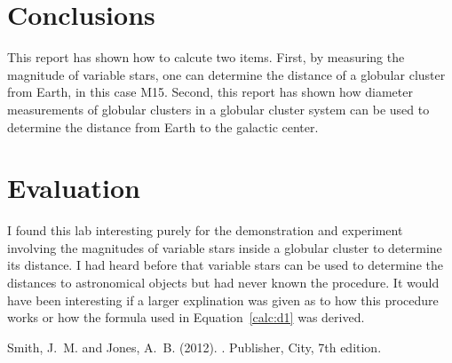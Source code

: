 \documentclass{article}
\begin{document}
\section{Conclusions}

This report has shown how to calcute two items. First, by measuring the magnitude of
variable stars, one can determine the distance of a globular cluster from Earth,
in this case M15. Second, this report has shown how diameter measurements of globular
clusters in a globular cluster system can be used to determine the distance from
Earth to the galactic center.


\section{Evaluation}

I found this lab interesting purely for the demonstration and experiment involving
the magnitudes of variable stars inside a globular cluster to determine its distance.
I had heard before that variable stars can be used to determine the distances to
astronomical objects but had never known the procedure. It would have been interesting
if a larger explination was given as to how this procedure works or how the formula
used in Equation~\ref{calc:d1} was derived.



\begin{thebibliography}{9}

Smith, J.~M. and Jones, A.~B. (2012).
.
\newblock Publisher, City, 7th edition.

\end{thebibliography}
\end{document}

